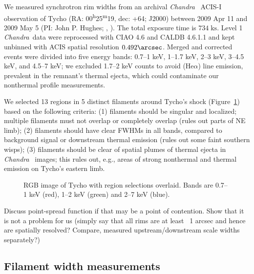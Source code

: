 \documentclass[manuscript]{aastex}  %
\newcommand{\mt}{\mathrm}
\newcommand{\unit}[1]{\;\mt{#1}}  %
\newcommand{\tsup}{\textsuperscript}
\newcommand{\Chandra}{\textit{Chandra}\ }
\begin{document}

We measured synchrotron rim widths from an archival \Chandra
ACIS-I observation of Tycho
(RA: 00\tsup{h}25\tsup{m}19, dec: +64; J2000)
between 2009 Apr 11 and 2009 May 5 (PI: John P. Hughes;
,
).
The total exposure time is $734 \unit{ks}$.
Level 1 \Chandra data were reprocessed with CIAO 4.6 and CALDB 4.6.1.1 and kept
unbinned with ACIS spatial resolution $0.492\arcsec$.
Merged and corrected events were divided into five energy bands:
0.7--1 keV, 1--1.7 keV, 2--3 keV, 3--4.5 keV, and 4.5--7 keV;
we excluded 1.7--2 keV counts to avoid  (He$\alpha$) line
emission, prevalent in the remnant's thermal ejecta, which could contaminate
our nonthermal profile measurements.

We selected 13 regions in 5 distinct filaments around Tycho's shock
(Figure~\ref{fig:snr}) based on the following criteria:
(1) filaments should be singular and localized; multiple filaments must not
overlap or completely overlap (rules out parts of NE limb);
(2) filaments should have clear FWHMs in all bands, compared to background
signal or downstream thermal emission (rules out some faint southern wisps);
(3) filaments should be clear of spatial plumes of thermal ejecta in \Chandra
images; this rules out, e.g., areas of strong nonthermal and thermal emission
on Tycho's eastern limb.

\begin{figure}
    \caption{RGB image of Tycho with region selections overlaid.  Bands are
    0.7--1 keV (red), 1--2 keV (green) and 2--7 keV (blue).
    }
    \label{fig:snr}
\end{figure}

Discuss point-spread function if that may be a point of contention.
Show that it is not a problem for us (simply say that all rims are at
least ~1 arcsec and hence are spatially resolved? Compare,
\citet{bamba2005-hist} measured upstream/downstream scale widths separately?)

\subsection{Filament width measurements}
\end{document}
